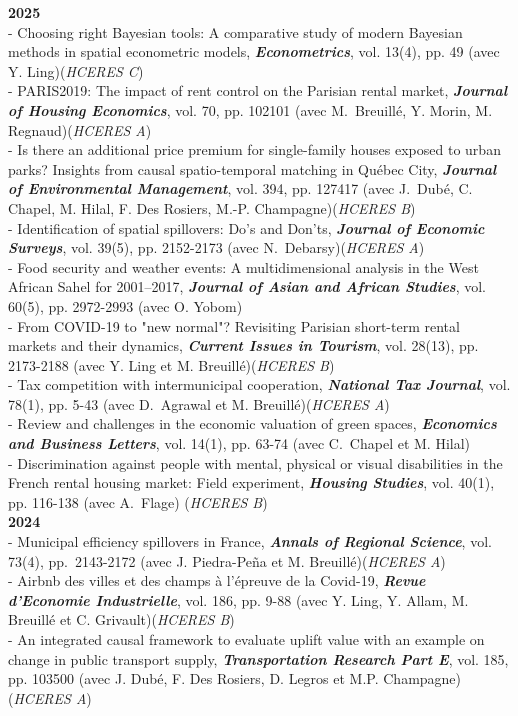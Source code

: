 \documentclass[a4paper,12pt]{article}
\begin{document}
\noindent \textbf{2025}  \smallskip \\ 
- Choosing right Bayesian tools: A comparative study of modern Bayesian methods in spatial econometric models, \textit{\textbf{Econometrics}}, vol. 13(4), pp. 49 (avec Y. Ling)(\textit{HCERES C}) \\
- PARIS2019: The impact of rent control on the Parisian rental market, \textit{\textbf{Journal of Housing Economics}}, vol. 70, pp. 102101 (avec M.~Breuillé, Y. Morin, M. Regnaud)(\textit{HCERES A}) \\
- Is there an additional price premium for single-family houses exposed to urban parks? Insights from causal spatio-temporal matching in Québec City, \textit{\textbf{Journal of Environmental Management}}, vol. 394, pp. 127417 (avec J.~Dubé, C. Chapel, M. Hilal, F. Des Rosiers, M.-P. Champagne)(\textit{HCERES B}) \\
- Identification of spatial spillovers: Do's and Don'ts, \textit{\textbf{Journal of Economic Surveys}}, vol. 39(5), pp. 2152-2173  (avec N.~Debarsy)(\textit{HCERES A}) \\
- Food security and weather events: A multidimensional analysis in the West African Sahel for 2001–2017, \textit{\textbf{Journal of Asian and African Studies}}, vol. 60(5), pp. 2972-2993 (avec O. Yobom) \\
- From COVID-19 to "new normal"? Revisiting Parisian short-term rental markets and their dynamics, \textit{\textbf{Current Issues in Tourism}}, vol. 28(13), pp. 2173-2188 (avec Y. Ling et M. Breuillé)(\textit{HCERES B}) \\
- Tax competition with intermunicipal cooperation, \textit{\textbf{National Tax Journal}}, vol. 78(1), pp. 5-43 (avec D.~Agrawal et M. Breuillé)(\textit{HCERES A}) \\
- Review and challenges in the economic valuation of green spaces, \textit{\textbf{Economics and Business Letters}}, vol. 14(1), pp. 63-74 (avec C.~Chapel et M. Hilal) \\
- Discrimination against people with mental, physical or visual disabilities in the French rental housing market: Field experiment, \textit{\textbf{Housing Studies}}, vol. 40(1), pp. 116-138 (avec A.~Flage) (\textit{HCERES B}) \\

\noindent \textbf{2024}  \smallskip \\ 
- Municipal efficiency spillovers in France, \textit{\textbf{Annals of Regional Science}}, vol. 73(4), pp.~2143-2172 (avec J. Piedra-Peña et M. Breuillé)(\textit{HCERES A}) \\
- Airbnb des villes et des champs à l'épreuve de la Covid-19, \textit{\textbf{Revue d'Economie Industrielle}}, vol. 186, pp. 9-88  (avec Y. Ling, Y. Allam, M. Breuillé et C. Grivault)(\textit{HCERES B}) \\
- An integrated causal framework to evaluate uplift value with an example on change in public transport supply, \textit{\textbf{Transportation Research Part E}}, vol. 185, pp. 103500  (avec J. Dubé, F. Des Rosiers, D. Legros et M.P. Champagne)(\textit{HCERES A}) \\
\end{document}
